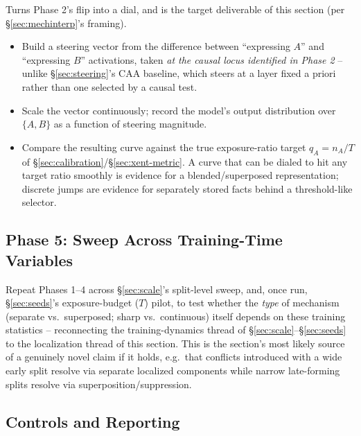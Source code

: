 \documentclass[11pt]{article}
\begin{document}
Turns Phase 2's flip into a dial, and is the target deliverable of this
section (per \S\ref{sec:mechinterp}'s framing).

\begin{itemize}
  \item Build a steering vector from the difference between ``expressing
    $A$'' and ``expressing $B$'' activations, taken \emph{at the causal locus
    identified in Phase 2} -- unlike \S\ref{sec:steering}'s CAA baseline,
    which steers at a layer fixed a priori rather than one selected by a
    causal test.
  \item Scale the vector continuously; record the model's output
    distribution over $\{A, B\}$ as a function of steering magnitude.
  \item Compare the resulting curve against the true exposure-ratio target
    $q_A = n_A/T$ of \S\ref{sec:calibration}/\S\ref{sec:xent-metric}. A curve
    that can be dialed to hit any target ratio smoothly is evidence for a
    blended/superposed representation; discrete jumps are evidence for
    separately stored facts behind a threshold-like selector.
\end{itemize}

\subsection{Phase 5: Sweep Across Training-Time Variables}
\label{sec:mechinterp-sweep}

Repeat Phases 1--4 across \S\ref{sec:scale}'s split-level sweep, and, once
run, \S\ref{sec:seeds}'s exposure-budget ($T$) pilot, to test whether the
\emph{type} of mechanism (separate vs.\ superposed; sharp vs.\ continuous)
itself depends on these training statistics -- reconnecting the
training-dynamics thread of \S\ref{sec:scale}--\S\ref{sec:seeds} to the
localization thread of this section. This is the section's most likely
source of a genuinely novel claim if it holds, e.g.\ that conflicts
introduced with a wide early split resolve via separate localized
components while narrow late-forming splits resolve via
superposition/suppression.

\subsection{Controls and Reporting}
\label{sec:mechinterp-controls}
\end{document}
